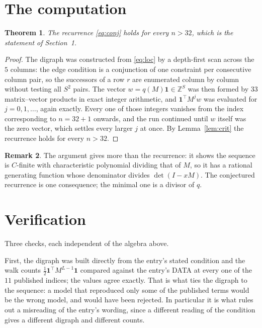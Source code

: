 \documentclass[11pt,a4paper]{article}
\theoremstyle{plain}
\newtheorem{theorem}{Theorem}
\theoremstyle{definition}
\newtheorem{remark}[theorem]{Remark}
\begin{document}
\section{The computation}

\begin{theorem}
The recurrence \eqref{eq:conj} holds for every $n>32$, which is the statement of
Section~1.
\end{theorem}

\begin{proof}
The digraph was constructed from \eqref{eq:loc} by a depth-first scan across the $5$
columns: the edge condition is a conjunction of one constraint per consecutive column
pair, so the successors of a row $r$ are enumerated column by column without testing all
$S^2$ pairs. The vector $w=q(M)\mathbf{1}\in\mathbb{Z}^{S}$ was then formed by $33$
matrix--vector products in exact integer arithmetic, and $\mathbf{1}^{\!\top}M^{j}w$ was
evaluated for $j=0,1,\dots$, again exactly. Every one of those integers vanishes from the
index corresponding to $n=32+1$ onwards, and the run continued until $w$ itself was the
zero vector, which settles every larger $j$ at once. By Lemma~\ref{lem:crit} the recurrence
holds for every $n>32$.
\end{proof}

\begin{remark}
The argument gives more than the recurrence: it shows the sequence is $C$-finite with
characteristic polynomial dividing that of $M$, so it has a rational generating function
whose denominator divides $\det(I-xM)$. The conjectured recurrence is one consequence; the
minimal one is a divisor of $q$.
\end{remark}

\section{Verification}

Three checks, each independent of the algebra above.

First, the digraph was built directly from the entry's stated condition and the walk counts
$\tfrac1{2}\mathbf{1}^{\!\top}M^{L-1}\mathbf{1}$ compared against the entry's DATA at
every one of the $11$ published indices; the values agree exactly. That is what ties
the digraph to the sequence: a model that reproduced only some of the published terms would
be the wrong model, and would have been rejected. In particular it is what rules out a
misreading of the entry's wording, since a different reading of the condition gives a
different digraph and different counts.
\end{document}
